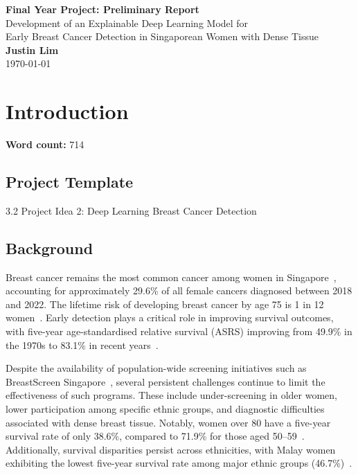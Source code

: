 \documentclass[12pt]{article}
\begin{document}
\begin{titlepage}
    \centering
    \vspace*{\fill}

    {\LARGE \textbf{Final Year Project: Preliminary Report}}\\[2em]
    {\large Development of an Explainable Deep Learning Model for}\\[0.5em]
    {\large Early Breast Cancer Detection in Singaporean Women with Dense Tissue}\\[4em]

    {\large \textbf{Justin Lim}}\\[1em]
    {\large \today}

    \vspace*{\fill}
\end{titlepage}
\newpage
\tableofcontents
\newpage

\newpage
\section{Introduction}
\noindent\textbf{Word count:} 714
\vspace{1em}

\subsection{Project Template}
3.2 Project Idea 2: Deep Learning Breast Cancer Detection

\subsection{Background}

Breast cancer remains the most common cancer among women in Singapore~\cite{10}, accounting for approximately 29.6\% of all female cancers diagnosed between 2018 and 2022. The lifetime risk of developing breast cancer by age 75 is 1 in 12 women~\cite{10}. Early detection plays a critical role in improving survival outcomes, with five-year age-standardised relative survival (ASRS) improving from 49.9\% in the 1970s to 83.1\% in recent years~\cite{10}.

Despite the availability of population-wide screening initiatives such as BreastScreen Singapore~\cite{6}, several persistent challenges continue to limit the effectiveness of such programs. These include under-screening in older women, lower participation among specific ethnic groups, and diagnostic difficulties associated with dense breast tissue. Notably, women over 80 have a five-year survival rate of only 38.6\%, compared to 71.9\% for those aged 50--59~\cite{10}. Additionally, survival disparities persist across ethnicities, with Malay women exhibiting the lowest five-year survival rate among major ethnic groups (46.7\%)~\cite{10}.
\end{document}
